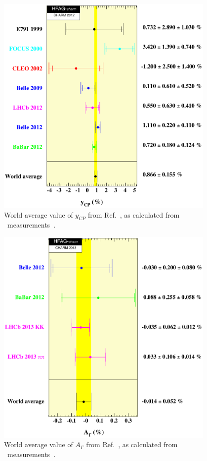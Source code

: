 \begin{figure}
\begin{center}
\includegraphics[width=4.2in]{figures/charm/ycp_13may12}
\end{center}
\vskip-0.20in
\caption{\label{fig:ycp}
World average value of $y^{}_{CP}$ from 
Ref.~\cite{HFAG_charm:webpage}, as calculated from \dkkpp\ 
measurements~\cite{Aitala:1999dt,Link:2000cu,Csorna:2001ww,
Zupanc:2009sy,Staric:2012ta,Lees:2012qh,Aaij:2011ad}.  }
\end{figure}


\begin{figure}
\begin{center}
\includegraphics[width=4.2in]{figures/charm/a_gamma_31aug13}
\end{center}
\vskip-0.20in
\caption{\label{fig:Agamma}
World average value of $A^{}_\Gamma$ from 
Ref.~\cite{HFAG_charm:webpage}, as calculated from \dkkpp\ 
measurements~\cite{Staric:2012ta,Lees:2012qh,Aaij:2013ria}.}
\end{figure}


